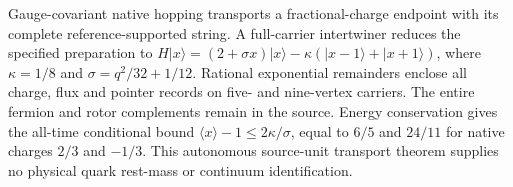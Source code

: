 Gauge-covariant native hopping transports a fractional-charge endpoint with
its complete reference-supported string. A full-carrier intertwiner reduces
the specified preparation to
\(H|x\rangle=(2+\sigma x)|x\rangle-\kappa(|x-1\rangle+|x+1\rangle)\),
where \(\kappa=1/8\) and \(\sigma=q^2/32+1/12\).
Rational exponential remainders enclose all charge, flux and pointer records
on five- and nine-vertex carriers. The entire fermion and rotor complements
remain in the source. Energy conservation gives the all-time conditional
bound \(\langle x\rangle-1\leq2\kappa/\sigma\), equal to \(6/5\) and
\(24/11\) for native charges \(2/3\) and \(-1/3\).
This autonomous source-unit transport theorem supplies no physical quark
rest-mass or continuum identification.
